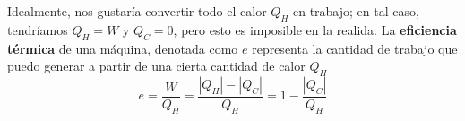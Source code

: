 \documentclass[12pt]{article}
\begin{document}
  Idealmente, nos gustaría convertir todo el calor $ Q_{H} $ en trabajo; en tal caso, tendríamos $ Q_{H} = W $ y $ Q_{C} = 0 $, pero esto es imposible en la realida. La \textbf{eficiencia térmica} de una máquina, denotada como $ e $ representa la cantidad de trabajo que puedo generar a partir de una cierta cantidad de calor $ Q_{H} $
  \[
  e = \frac{W}{Q_{H}} = \frac{\left|Q_{H}\right| - \left|Q_{C}\right|}{Q_{H}} = 1 - \frac{\left|Q_{C}\right|}{Q_{H}}
  \]



























  
\end{document}
